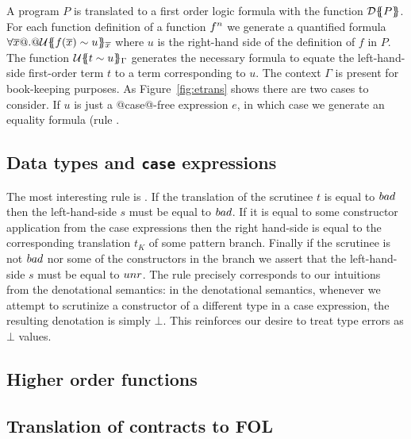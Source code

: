 A program $P$ is translated to a first order logic formula with the function 
$\dtrans{}{P}$. For each function definition of a function $f^\ar$ we generate
a quantified formula $\forall \xs @.@ \utrans{}{\ol{x}}{f(\ol{x}) \sim u}$ where $u$ is the 
right-hand side of the definition of $f$ in $P$. The function 
$\utrans{}{\Gamma}{t \sim u}$ generates the necessary formula to equate the left-hand-side
first-order term $t$ to a term corresponding to $u$. The context $\Gamma$ is present
for book-keeping purposes. As Figure~\ref{fig:etrans} shows there are two cases to 
consider. If $u$ is just a @case@-free expression $e$, in which case we generate
an equality formula (rule . 

\subsection{Data types and {\tt case} expressions}

The most interesting rule is . If the translation of the scrutinee
$t$ is equal to $\bad$ then the left-hand-side $s$ must be equal to $\bad$. If it is 
equal to some constructor application from the case expressions then the right 
hand-side is equal to the corresponding translation $t_K$ of some pattern branch. Finally
if the scrutinee is not $\bad$ nor some of the constructors in the branch we assert that
the left-hand-side $s$ must be equal to $\unr$. The rule precisely corresponds to our 
intuitions from the denotational semantics: in the denotational semantics, whenever
we attempt to scrutinize a constructor of a different type in a case expression, the 
resulting denotation is simply $\bot$. This reinforces our desire to treat type errors
as $\bot$ values. 

\subsection{Higher order functions}


\subsection{Translation of contracts to FOL}

